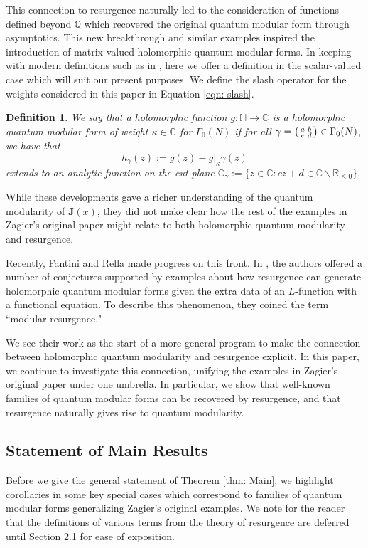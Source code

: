 \documentclass[12pt]{amsart}
\theoremstyle{definition}
\theoremstyle{plain}
\newtheorem{definition}[theorem]{Definition}
\numberwithin{equation}{section}
\begin{document}
This connection to resurgence naturally led to the consideration of functions defined beyond $\mathbb{Q}$ which recovered the original quantum modular form through asymptotics. This new breakthrough and similar examples inspired the introduction of matrix-valued holomorphic quantum modular forms. In keeping with modern definitions such as in \cite{zagiertalk}, here we offer a definition in the scalar-valued case which will suit our present purposes. We define the slash operator for the weights considered in this paper in Equation \ref{eqn: slash}.
\begin{definition}
	We say that a holomorphic function $g \colon \mathbb{H} \to \mathbb{C}$ is a holomorphic quantum modular form of weight $\kappa \in \mathbb{C}$ for $\Gamma_0(N)$ if for all $\gamma =\begin{psmallmatrix} a & b \\ c & d \end{psmallmatrix} \in \Gamma_0(N)$, we have that 
	\[h_\gamma(z):= g(z) - g|_{\kappa }\gamma(z) 
	\]
	extends to an analytic function on the cut plane $\displaystyle{\mathbb{C}_\gamma := \{ z \in \mathbb{C} : cz+d \in \mathbb{C}\backslash\mathbb{R}_{\leq 0}\}.}$
\end{definition}

While these developments gave a richer understanding of the quantum modularity of $\mathbf{J}(x)$, they did not make clear how the rest of the examples in Zagier's original paper might relate to both holomorphic quantum modularity and resurgence.

Recently, Fantini and Rella made progress on this front. In \cite{fantini-rella}, the authors offered a number of conjectures supported by examples about how resurgence can generate holomorphic quantum modular forms given the extra data of an $L$-function with a functional equation. To describe this phenomenon, they coined the term ``modular resurgence."

We see their work as the start of a more general program to make the connection between holomorphic quantum modularity and resurgence explicit. 
In this paper, we continue to investigate this connection, unifying the examples in Zagier's original paper under one umbrella. In particular, we show that well-known families of quantum modular forms can be recovered by resurgence, and that resurgence naturally gives rise to quantum modularity. 

\subsection{Statement of Main Results} Before we give the general statement of Theorem \ref{thm: Main}, we highlight corollaries in some key special cases which correspond to families of quantum modular forms generalizing Zagier's original examples. 
We note for the reader that the definitions of various terms from the theory of resurgence are deferred until Section 2.1 for ease of exposition.
\end{document}
